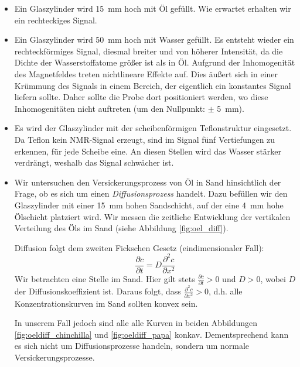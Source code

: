 \documentclass[a4paper]{scrartcl} %
\begin{document}
\begin{itemize}
	\item Ein Glaszylinder wird \SI{15}{mm} hoch mit Öl gefüllt. Wie erwartet erhalten wir ein rechteckiges Signal.
	\item Ein Glaszylinder wird \SI{50}{mm} hoch mit Wasser gefüllt. Es entsteht wieder ein rechteckförmiges Signal, diesmal breiter und von höherer Intensität, da die Dichte der Wasserstoffatome größer ist als in Öl. Aufgrund der Inhomogenität des Magnetfeldes treten nichtlineare Effekte auf. Dies äußert sich in einer Krümmung des Signals in einem Bereich, der eigentlich ein konstantes Signal liefern sollte. Daher sollte die Probe dort positioniert werden, wo diese Inhomogenitäten nicht auftreten (um den Nullpunkt: $\pm$ \SI{5}{mm}).
	\item Es wird der Glaszylinder mit der scheibenförmigen Teflonstruktur eingesetzt. Da Teflon kein NMR-Signal erzeugt, sind im Signal fünf Vertiefungen zu erkennen, für jede Scheibe eine. An diesen Stellen wird das Wasser stärker verdrängt, weshalb das Signal schwächer ist.
	\item Wir untersuchen den Versickerungsprozess von Öl in Sand hinsichtlich der Frage, ob es sich um einen \emph{Diffusionsprozess} handelt. Dazu befüllen wir den Glaszylinder mit einer \SI{15}{mm} hohen Sandschicht, auf der eine \SI{4}{mm} hohe Ölschicht platziert wird. Wir messen die zeitliche Entwicklung der vertikalen Verteilung des Öls im Sand (siehe Abbildung \ref{fig:oel_diff}).

	Diffusion folgt dem zweiten Fickschen Gesetz (eindimensionaler Fall):
	\begin{equation}
		\frac{\partial c}{\partial t} = D \frac{\partial^2 c}{\partial x^2}
	\end{equation}
	Wir betrachten eine Stelle im Sand. Hier gilt stets $\tfrac{\partial c}{\partial t} > 0$ und $D > 0$, wobei $D$ der Diffusionskoeffizient ist. Daraus folgt, dass $\tfrac{\partial^2 c}{\partial x^2} > 0$, d.h. alle Konzentrationskurven im Sand sollten konvex sein.

	In unserem Fall jedoch sind alle alle Kurven in beiden Abbildungen \ref{fig:oeldiff_chinchilla} und \ref{fig:oeldiff_papa} konkav. Dementsprechend kann es sich nicht um Diffusionsprozesse handeln, sondern um normale Versickerungsprozesse.
\end{itemize}
\end{document}

